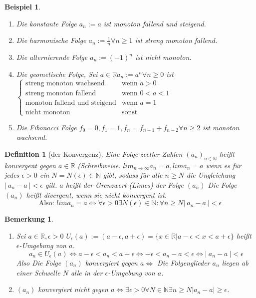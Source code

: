 \documentclass[a4paper,titlepage,oneside]{article}
\def\N{\ensuremath{\mathbb{N}} }
\def\R{\ensuremath{\mathbb{R}} }
\newcommand{\fa}[1]{\ensuremath{\forall#1}}
\newcommand{\exin}[2]{\ensuremath{\exists#1\in#2}}
\newcommand{\abs}[1]{\ensuremath{\left|\:#1\:\right|}}
\theoremstyle{thmstyle}
\newtheorem{defi}[satz]{Definition}
\newtheorem{bsp}[satz]{Beispiel}
\newtheorem{bem}[satz]{Bemerkung}
\begin{document}
\begin{bsp}
\begin{enumerate}
\item Die konstante Folge $a_n := a$ ist monoton fallend und steigend.
\item Die harmonische Folge $a_n := \frac{1}{n} \fa{n\ge1}$ ist streng monoton fallend.
\item Die alternierende Folge $a_n := (-1)^n$ ist nicht monoton.
\item Die geometische Folge, Sei $a\in\R a_n := a^n \fa{n\ge0}$ ist \(\begin{cases}
\text{streng monoton wachsend} & \text{wenn } a > 0\\
\text{streng monoton fallend} & \text{wenn } 0 < a < 1\\
\text{monoton fallend und steigend} & \text{wenn } a = 1\\
\text{nicht monoton} & \text{sonst}
\end{cases} \)
\item Die Fibonacci Folge \(f_0 = 0, f_1 = 1, f_n = f_{n-1} + f_{n-2} \fa{n \ge 2}\) ist monoton wachsend.
\end{enumerate}
\end{bsp}

\begin{defi}[der Konvergenz]
Eine Folge zeeller Zahlen $(a_n)_{n\in\N}$ heißt konvergent gegen $ a\in\R$ (Schreibweise. ${lim}_{n\rightarrow\infty}a_n = a, lim a_n = a$
wenn es für jedes $\epsilon > 0$ ein $N = N(\epsilon) \in \N$ gibt, sodass für alle $n \ge N$ die Ungleichung $\abs{a_n - a} < \epsilon$ gilt.
$a$ heißt der Grenzwert (Limes) der Folge $(a_n)$
Die Folge $(a_n)$ heißt divergent, wenn sie nicht konvergent ist.
\[\text{Also: }lim a_n = a \Leftrightarrow \fa{\epsilon > 0} \exin{N(\epsilon)}{\N} : \fa{n\ge N} \abs{a_n - a} < \epsilon\]
\end{defi}

\begin{bem}
\begin{enumerate}
\item Sei $a \in \R, \epsilon > 0$ $U_\epsilon(a) := (a-\epsilon, a+\epsilon) = \{x \in \R | a - \epsilon < x < a + \epsilon\}$ heißt $\epsilon$-Umgebung von $a$. \[ a_n \in U_\epsilon(a) \Leftrightarrow a-\epsilon < a_n < a + \epsilon \Leftrightarrow -\epsilon < a_n - a < \epsilon \Leftrightarrow \abs{a_n - a} < \epsilon\]
Also Die Folge $(a_n)$ konvergiert gegen $a \Leftrightarrow $ Die Folgenglieder $a_n$ liegen ab einer Schwelle $N$ alle in der $\epsilon$-Umgebung von $a$.
\item $(a_n)$ konvergiert nicht gegen $a \Leftrightarrow \exists \epsilon > 0 \forall N\in\N \exists n \ge N |a_n - a| \ge \epsilon$.
\end{enumerate}
\end{bem}
\end{document}
